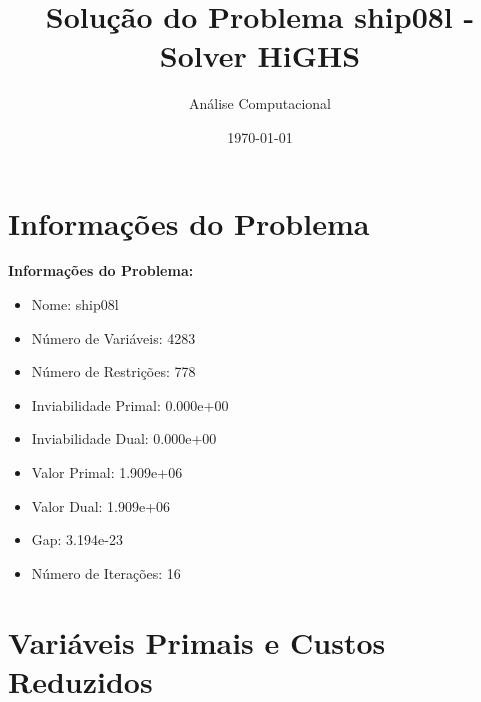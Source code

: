\documentclass[12pt]{article}
\title{Solução do Problema ship08l - Solver HiGHS}
\author{Análise Computacional}
\date{\today}
\begin{document}
\maketitle

\section{Informações do Problema}

\textbf{Informações do Problema:}
\begin{itemize}
\item Nome: ship08l
\item Número de Variáveis: 4283
\item Número de Restrições: 778
\item Inviabilidade Primal: 0.000e+00
\item Inviabilidade Dual: 0.000e+00
\item Valor Primal: 1.909e+06
\item Valor Dual: 1.909e+06
\item Gap: 3.194e-23
\item Número de Iterações: 16
\end{itemize}


\section{Variáveis Primais e Custos Reduzidos}
\end{document}
